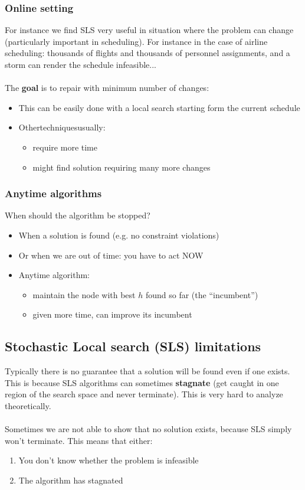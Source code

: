 \documentclass{article}
\def\blu#1{{\color{blu}#1}}
\def\red#1{{\color{red}#1}}
\begin{document}
\subsubsection*{Online setting}
For instance we find SLS very useful in situation where the problem can change (particularly important in scheduling). For instance in the case of airline scheduling: thousands of flights and thousands of personnel assignments, and a storm can render the schedule infeasible... \\ \\
The \textbf{goal} is to \blu{repair} with minimum number of changes:
\begin{itemize}
	\item This can be easily done with a local search starting form the current schedule
	\item Othertechniquesusually:
	\begin{itemize}
		\item require more time
		\item might find solution requiring many more changes
	\end{itemize}
\end{itemize}

\subsubsection*{Anytime algorithms}
When should the algorithm be stopped?
\begin{itemize}
	\item When a solution is found (e.g. no constraint violations)
	\item Or when we are out of time: you have to act NOW
	\item Anytime algorithm:
	\begin{itemize}
		\item maintain the node with best $ h $ found so far (the “incumbent”) 
		\item given more time, can improve its incumbent
	\end{itemize}
\end{itemize}


\subsection*{Stochastic Local search (SLS) limitations}
Typically there is no guarantee that a solution will be found even if one exists. This is because SLS algorithms can sometimes \red{\textbf{stagnate}} (get caught in one region of the search space and never terminate). This is very hard to analyze theoretically. \\ \\
Sometimes we are not able to show that no solution exists, because SLS simply won’t terminate. This means that either:
\begin{enumerate}
	\item You don’t know whether the problem is infeasible 
	\item The algorithm has stagnated
\end{enumerate}
\end{document}
